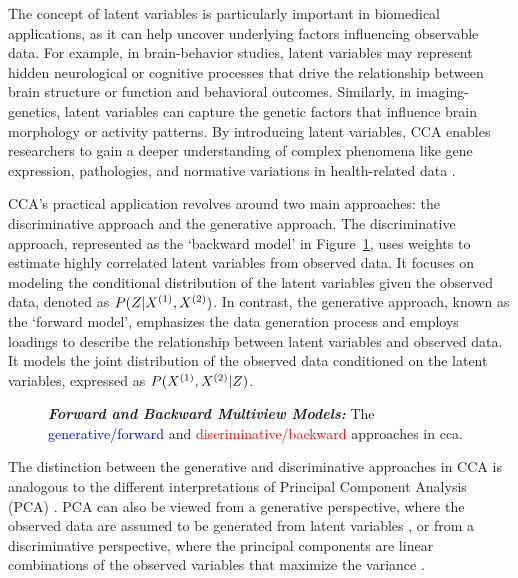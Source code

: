 The concept of latent variables is particularly important in biomedical applications, as it can help uncover underlying factors influencing observable data. For example, in brain-behavior studies, latent variables may represent hidden neurological or cognitive processes that drive the relationship between brain structure or function and behavioral outcomes. Similarly, in imaging-genetics, latent variables can capture the genetic factors that influence brain morphology or activity patterns. By introducing latent variables, CCA enables researchers to gain a deeper understanding of complex phenomena like gene expression, pathologies, and normative variations in health-related data \citep{lawry2023multi}.

CCA's practical application revolves around two main approaches: the discriminative approach and the generative approach. The discriminative approach, represented as the `backward model' in Figure~\ref{fig:forward-backward-models}, uses weights to estimate highly correlated latent variables from observed data. It focuses on modeling the conditional distribution of the latent variables given the observed data, denoted as $P(Z|X^{(1)},X^{(2)})$. In contrast, the generative approach, known as the `forward model', emphasizes the data generation process and employs loadings to describe the relationship between latent variables and observed data. It models the joint distribution of the observed data conditioned on the latent variables, expressed as $P(X^{(1)},X^{(2)}|Z)$.

\begin{figure}
    \centering
    \caption[Forward and Backward Multiview Models]{\textit{\textbf{Forward and Backward Multiview Models:}} The \textcolor{blue}{generative/forward} and \textcolor{red}{discriminative/backward} approaches in \acrshort{cca}.}\label{fig:forward-backward-models}
\end{figure}

The distinction between the generative and discriminative approaches in CCA is analogous to the different interpretations of Principal Component Analysis (PCA) \citep{park2023critical}. PCA can also be viewed from a generative perspective, where the observed data are assumed to be generated from latent variables \citep{tipping1999probabilistic}, or from a discriminative perspective, where the principal components are linear combinations of the observed variables that maximize the variance \citep{hotelling1933analysis}.

